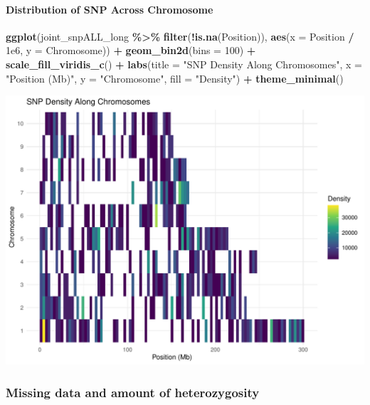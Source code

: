 \documentclass[
]{article}
\newenvironment{Shaded}{\begin{snugshade}}{\end{snugshade}}
\newcommand{\AttributeTok}[1]{\textcolor[rgb]{0.13,0.29,0.53}{#1}}
\newcommand{\DecValTok}[1]{\textcolor[rgb]{0.00,0.00,0.81}{#1}}
\newcommand{\FloatTok}[1]{\textcolor[rgb]{0.00,0.00,0.81}{#1}}
\newcommand{\FunctionTok}[1]{\textcolor[rgb]{0.13,0.29,0.53}{\textbf{#1}}}
\newcommand{\NormalTok}[1]{#1}
\newcommand{\SpecialCharTok}[1]{\textcolor[rgb]{0.81,0.36,0.00}{\textbf{#1}}}
\newcommand{\StringTok}[1]{\textcolor[rgb]{0.31,0.60,0.02}{#1}}
\begin{document}
\paragraph{Distribution of SNP Across
Chromosome}\label{distribution-of-snp-across-chromosome}

\begin{Shaded}
\begin{Highlighting}[]
\FunctionTok{ggplot}\NormalTok{(joint\_snpALL\_long }\SpecialCharTok{\%\textgreater{}\%} \FunctionTok{filter}\NormalTok{(}\SpecialCharTok{!}\FunctionTok{is.na}\NormalTok{(Position)), }
       \FunctionTok{aes}\NormalTok{(}\AttributeTok{x =}\NormalTok{ Position }\SpecialCharTok{/} \FloatTok{1e6}\NormalTok{, }\AttributeTok{y =}\NormalTok{ Chromosome)) }\SpecialCharTok{+}
  \FunctionTok{geom\_bin2d}\NormalTok{(}\AttributeTok{bins =} \DecValTok{100}\NormalTok{) }\SpecialCharTok{+}  
  \FunctionTok{scale\_fill\_viridis\_c}\NormalTok{() }\SpecialCharTok{+} 
  \FunctionTok{labs}\NormalTok{(}\AttributeTok{title =} \StringTok{"SNP Density Along Chromosomes"}\NormalTok{,}
       \AttributeTok{x =} \StringTok{"Position (Mb)"}\NormalTok{, }\AttributeTok{y =} \StringTok{"Chromosome"}\NormalTok{, }\AttributeTok{fill =} \StringTok{"Density"}\NormalTok{) }\SpecialCharTok{+}
  \FunctionTok{theme\_minimal}\NormalTok{()}
\end{Highlighting}
\end{Shaded}

\includegraphics{R_Assignment_files/figure-latex/unnamed-chunk-12-1.pdf}

\subsubsection{Missing data and amount of
heterozygosity}\label{missing-data-and-amount-of-heterozygosity}
\end{document}
